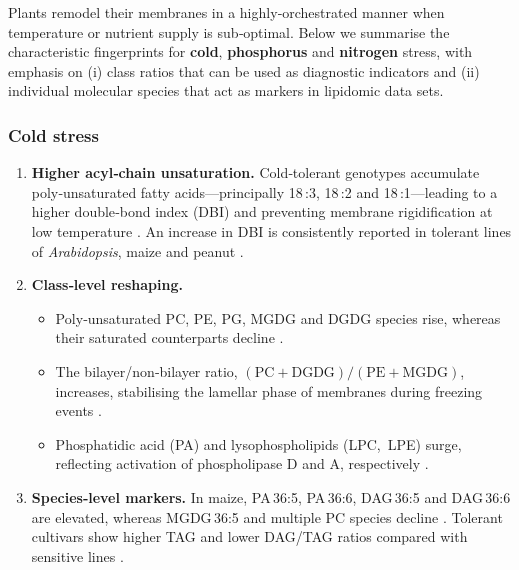 \documentclass[10pt,letterpaper]{article}
\begin{document}
Plants remodel their membranes in a highly‐orchestrated manner when temperature or nutrient supply is sub‑optimal.  Below we summarise the characteristic fingerprints for \textbf{cold}, \textbf{phosphorus} and \textbf{nitrogen} stress, with emphasis on (i) class ratios that can be used as diagnostic indicators and (ii) individual molecular species that act as markers in lipidomic data sets.

\subsubsection*{Cold stress}
\label{sec:cold}

\begin{enumerate}[label=\textbf{\arabic*.}, leftmargin=1.2em]
  \item \textbf{Higher acyl‑chain unsaturation.}  Cold‐tolerant genotypes accumulate poly‑unsaturated fatty acids—principally 18\,:3, 18\,:2 and 18\,:1—leading to a higher double‑bond index (DBI) and preventing membrane rigidification at low temperature \citep[pp.~431–440, 460]{Low_temp_stress_Bhattacharya}.  An increase in DBI is consistently reported in tolerant lines of \textit{Arabidopsis}, maize and peanut \citep[pp.~11–12]{Lipid_transcriptome_Cold_stress_Yu}.

  \item \textbf{Class‑level reshaping.}  
        \begin{itemize}
          \item Poly‑unsaturated PC, PE, PG, MGDG and DGDG species rise, whereas their saturated counterparts decline \citep[pp.~3–4]{Low_temperatures_Wang,Low_temp_stress_Bhattacharya}.  
          \item The bilayer/non‑bilayer ratio, \(\mathrm{(PC+DGDG)/(PE+MGDG)}\), increases, stabilising the lamellar phase of membranes during freezing events \citep[pp.~492–493]{Low_temp_stress_Bhattacharya}.  
          \item Phosphatidic acid (PA) and lysophospholipids (LPC, LPE) surge, reflecting activation of phospholipase D and A, respectively \citep[pp.~456, 472--474]{Low_temp_stress_Bhattacharya}.
        \end{itemize}

  \item \textbf{Species‑level markers.}  In maize, PA\,36:5, PA\,36:6, DAG\,36:5 and DAG\,36:6 are elevated, whereas MGDG\,36:5 and multiple PC species decline \citep[pp.~6–8]{cold_tolerance_maize_Shi}.  Tolerant cultivars show higher TAG and lower DAG/TAG ratios compared with sensitive lines \citep[pp.~11]{Lipid_transcriptome_Cold_stress_Yu}.


\end{enumerate}
\end{document}
